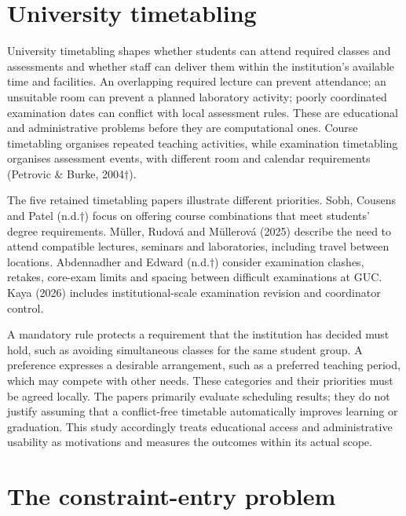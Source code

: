 \documentclass[
  11pt,a4paper,oneside]{report}
\begin{document}
\hypertarget{university-timetabling}{%
\section{University timetabling}\label{university-timetabling}}

University timetabling shapes whether students can attend required classes and assessments and whether staff can deliver them within the institution's available time and facilities. An overlapping required lecture can prevent attendance; an unsuitable room can prevent a planned laboratory activity; poorly coordinated examination dates can conflict with local assessment rules. These are educational and administrative problems before they are computational ones. Course timetabling organises repeated teaching activities, while examination timetabling organises assessment events, with different room and calendar requirements (Petrovic \& Burke, 2004$\dagger$).

The five retained timetabling papers illustrate different priorities. Sobh, Cousens and Patel (n.d.$\dagger$) focus on offering course combinations that meet students' degree requirements. Müller, Rudová and Müllerová (2025) describe the need to attend compatible lectures, seminars and laboratories, including travel between locations. Abdennadher and Edward (n.d.$\dagger$) consider examination clashes, retakes, core-exam limits and spacing between difficult examinations at GUC. Kaya (2026) includes institutional-scale examination revision and coordinator control.

A mandatory rule protects a requirement that the institution has decided must hold, such as avoiding simultaneous classes for the same student group. A preference expresses a desirable arrangement, such as a preferred teaching period, which may compete with other needs. These categories and their priorities must be agreed locally. The papers primarily evaluate scheduling results; they do not justify assuming that a conflict-free timetable automatically improves learning or graduation. This study accordingly treats educational access and administrative usability as motivations and measures the outcomes within its actual scope.

\hypertarget{the-constraint-entry-problem}{%
\section{The constraint-entry
problem}\label{the-constraint-entry-problem}}
\end{document}
